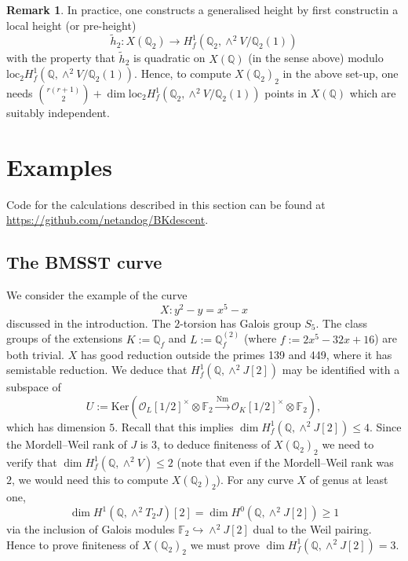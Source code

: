 \documentclass[11pt]{amsart}
\def\Q{\mathbb Q}
\def\F{\mathbb F}
\theoremstyle{plain}
\theoremstyle{definition}
\newtheorem{remark}{Remark}
\newcommand{\Nm}{\mathrm{Nm}}
\newcommand{\loc}{\mathrm{loc}}
\newcommand{\Ker}{\mathrm{Ker}}
\begin{document}
\begin{remark}
In practice, one constructs a generalised height by first constructin a local height (or pre-height)
\[
\widetilde{h}_2 :X(\Q _2 )\to H^1 _f (\Q _2 ,\wedge ^2 V/\Q _2 (1))
\]
with the property that $\widetilde{h}_2 $ is quadratic on $X(\Q )$ (in the sense above) modulo $\loc _2 H^1 _f (\Q ,\wedge ^2 V/\Q _2 (1))$. Hence, to compute $X(\Q _2 )_2$ in the above set-up, one needs $\binom{r(r+1)}{2}+\dim \loc _2 H^1 _f (\Q _2 ,\wedge ^2 V/\Q _2 (1))$ points in $X(\Q )$ which are suitably independent.
\end{remark}
\section{Examples}
Code for the calculations described in this section can be found at \url{https://github.com/netandog/BKdescent}.
\subsection{The BMSST curve}
We consider the example of the curve 
\[
X:y^2 -y =x^5 -x
\]
discussed in the introduction. The $2$-torsion has Galois group $S_5 $. The class groups of the extensions $K:=\Q _f$ and $L:=\Q _f ^{(2)}$ (where $f:=2x^5-32x+16$) are both trivial. 
$X$ has good reduction outside the primes 139 and 449, where it has semistable reduction. We deduce that $H^1 _f (\Q ,\wedge ^2 J[2])$ may be identified with a subspace of 
\[
U:=\Ker (\mathcal{O}_L [1/2]^\times \otimes \F _2 \stackrel{\Nm }{\longrightarrow } \mathcal{O}_K [1/2]^\times \otimes \F _2 ),
\]
which has dimension $5$. Recall that this implies $\dim H^1 _f (\Q ,\wedge ^2 J[2])\leq 4$. Since the Mordell--Weil rank of $J$ is $3$, to deduce finiteness of $X(\Q _2 )_2 $ we need to verify that $\dim H^1 _f (\Q ,\wedge ^2 V)\leq 2$ (note that even if the Mordell--Weil rank was $2$, we would need this to compute $X(\Q _2 )_2$). For any curve $X$ of genus at least one, 
\[
\dim H^1 (\Q ,\wedge ^2 T_2 J)[2]=\dim H^0 (\Q ,\wedge ^2 J[2]) \geq 1
\] 
via the inclusion of Galois modules $\F _2 \hookrightarrow \wedge ^2 J[2]$ dual to the Weil pairing. Hence to prove finiteness of $X(\Q _2 )_2 $ we must prove $\dim H^1 _f (\Q ,\wedge ^2 J[2])=3$.
\end{document}
